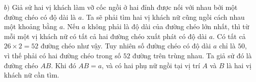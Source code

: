 \begin{multicols}{2}
	\vskip 0.1cm
	$b)$ Giả sử hai vị khách làm vỡ cốc ngồi ở hai đỉnh được nối với nhau bởi một đường chéo có độ dài là $a$. Ta sẽ phải tìm hai vị khách nữ cũng ngồi cách nhau một khoảng bằng $a$.
	\vskip 0.1cm
	Nếu $a$ không phải là độ dài của đường chéo lớn nhất, thì từ mỗi một vị khách nữ có tất cả hai đường chéo xuất phát có độ dài $a$. Có tất cả $26\times 2= 52$ đường chéo như vậy. Tuy nhiên số đường chéo có độ dài $a$ chỉ là $50$, vì thế phải có hai đường chéo trong số $52$ đường trên trùng nhau. Ta giả sử đó là đường chéo $AB$. Khi đó $AB=a$, và có hai phụ nữ ngồi tại vị trí $A$ và $B$ là hai vị khách nữ cần tìm.
\end{multicols}
\newpage
\begingroup
\thispagestyle{toancuabinone}
